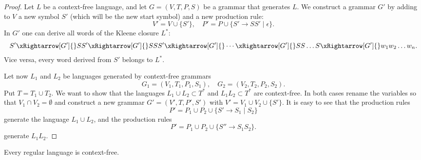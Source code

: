 \begin{page}
\setcounter{section}{7}
\setcounter{subsection}{1}
\setcounter{dfn}{1}
\label{portion:1292}


\begin{proof}
Let $L$ be a context-free language, and let $G = (V, T, P, S)$ be a grammar that generates $L$.
We construct a grammar $G'$ by adding to $V$ a new symbol $S'$ (which will be the new start symbol) and a new production rule:
\[
V' = V \cup \{S'\}, \quad P' = P \cup \{S' \to SS' \mid \epsilon\}.
\]
In $G'$ one can derive all words of the Kleene closure $L^*$:
\[
S' \xRightarrow[G']{} SS' \xRightarrow[G']{} SSS' \xRightarrow[G']{} \cdots \xRightarrow[G']{} SS \ldots S \xRightarrow[G']{} w_1 w_2 \ldots w_n.
\]
Vice versa, every word derived from $S'$ belongs to $L^*$.

Let now $L_1$ and $L_2$ be languages generated by context-free grammars
\[
G_1 = (V_1, T_1, P_1, S_1), \quad G_2 = (V_2, T_2, P_2, S_2).
\]
Put $T = T_1 \cup T_2$.
We want to show that the languages $L_1 \cup L_2 \subset T^*$ and $L_1L_2 \subset T^*$ are context-free.
In both cases rename the variables so that $V_1 \cap V_2 = \emptyset$
and construct a new grammar $G' = (V', T, P', S')$ with $V' = V_1 \cup V_2 \cup \{S'\}$.
It is easy to see that the production rules
\[
P' = P_1 \cup P_2 \cup \{S' \to S_1 \mid S_2\}
\]
generate the language $L_1 \cup L_2$,
and the production rules
\[
P' = P_1 \cup P_2 \cup \{S'' \to S_1S_2\}.
\]
generate $L_1L_2$.
\end{proof}


\end{page}

\begin{page}
\setcounter{section}{7}
\setcounter{subsection}{1}
\setcounter{dfn}{2}
\label{portion:1294}

\begin{cor}
Every regular language is context-free.
\end{cor}

\end{page}

